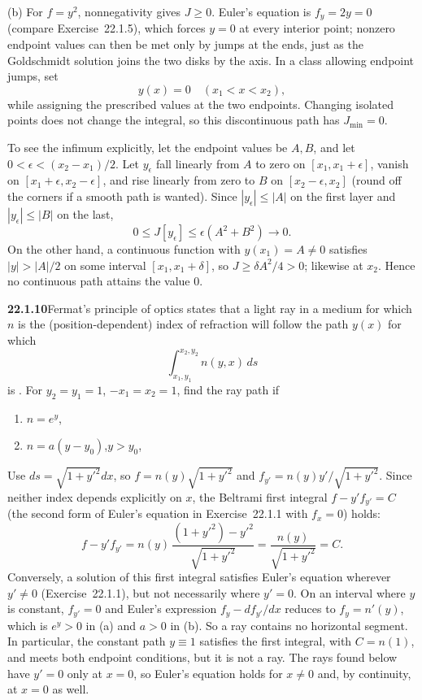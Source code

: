 (b) For $f=y^2$, nonnegativity gives $J\ge0$. Euler's equation is
$f_y=2y=0$ (compare Exercise~22.1.5), which forces $y=0$ at every
interior point; nonzero endpoint values can then be met only by jumps
at the ends, just as the Goldschmidt solution joins the two disks by the
axis. In a class allowing endpoint jumps, set
\[
y(x)=0\quad(x_1<x<x_2),
\]
while assigning the prescribed values at the two endpoints.
Changing isolated points does not change the integral, so this
discontinuous path has $\boxed{J_{\min}=0}$.

To see the infimum explicitly, let the endpoint values be $A,B$, and
let $0<\epsilon<(x_2-x_1)/2$. Let $y_\epsilon$ fall linearly from $A$
to zero on $[x_1,x_1+\epsilon]$, vanish on
$[x_1+\epsilon,x_2-\epsilon]$, and rise linearly from zero to $B$ on
$[x_2-\epsilon,x_2]$ (round off the corners if a smooth path is
wanted). Since $|y_\epsilon|\le|A|$ on the first layer and
$|y_\epsilon|\le|B|$ on the last,
\[
0\le J[y_\epsilon]\le\epsilon(A^2+B^2)\longrightarrow0.
\]
On the other hand, a continuous function with $y(x_1)=A\ne0$ satisfies
$|y|>|A|/2$ on some interval $[x_1,x_1+\delta]$, so
$J\ge\delta A^2/4>0$; likewise at $x_2$. Hence no continuous path
attains the value $0$.


\par\bigskip
\noindent\textbf{22.1.10}\quad Fermat's principle of optics states
that a light ray in a medium for which $n$ is the
(position-dependent) index of refraction will follow the path
$y(x)$ for which
\[
\int_{x_{1},y_{1}}^{x_{2},y_{2}}n(y,x)\,ds
\]
is . For $y_{2}=y_{1}=1$, $-x_{1}=x_{2}=1$, find the
ray path  if
\begin{enumerate}
\item[(a)] $n=e^{y}$,\qquad
\item[(b)] $n=a(y-y_{0})$,\quad$y>y_{0}$,
\end{enumerate}
\solution
Use $ds=\sqrt{1+y'^2}dx$, so $f=n(y)\sqrt{1+y'^2}$ and
$f_{y'}=n(y)y'/\sqrt{1+y'^2}$. Since neither index depends explicitly
on $x$, the Beltrami first integral $f-y'f_{y'}=C$ (the second form of
Euler's equation in Exercise~22.1.1 with $f_x=0$) holds:
\[
f-y'f_{y'}=n(y)\,\frac{(1+y'^2)-y'^2}{\sqrt{1+y'^2}}
=\frac{n(y)}{\sqrt{1+y'^2}}=C.
\]
Conversely, a solution of this first integral satisfies Euler's
equation wherever $y'\ne0$ (Exercise~22.1.1), but not necessarily
where $y'=0$. On an interval where $y$ is constant, $f_{y'}=0$ and
Euler's expression $f_y-df_{y'}/dx$ reduces to $f_y=n'(y)$, which is
$e^y>0$ in (a) and $a>0$ in (b). So a ray contains no horizontal
segment. In particular, the constant path $y\equiv1$ satisfies the
first integral, with $C=n(1)$, and meets both endpoint conditions, but
it is not a ray. The rays found below have $y'=0$ only at $x=0$, so
Euler's equation holds for $x\ne0$ and, by continuity, at $x=0$ as well.

